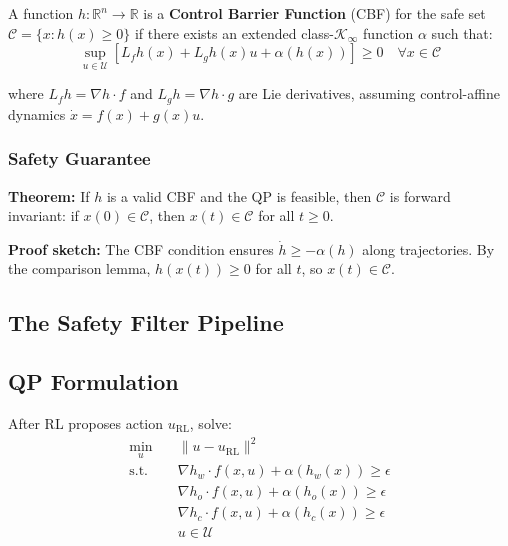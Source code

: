 \documentclass[11pt,a4paper]{report}
\begin{document}
A function $h: \mathbb{R}^n \to \mathbb{R}$ is a \textbf{Control Barrier Function} (CBF) for the safe set $\mathcal{C} = \{x : h(x) \geq 0\}$ if there exists an extended class-$\mathcal{K}_\infty$ function $\alpha$ such that:
\begin{equation}
    \sup_{u \in \mathcal{U}} \left[ L_f h(x) + L_g h(x) u + \alpha(h(x)) \right] \geq 0 \quad \forall x \in \mathcal{C}
\end{equation}

where $L_f h = \nabla h \cdot f$ and $L_g h = \nabla h \cdot g$ are Lie derivatives, assuming control-affine dynamics $\dot{x} = f(x) + g(x)u$.

\subsubsection{Safety Guarantee}

\textbf{Theorem:} If $h$ is a valid CBF and the QP is feasible, then $\mathcal{C}$ is forward invariant: if $x(0) \in \mathcal{C}$, then $x(t) \in \mathcal{C}$ for all $t \geq 0$.

\textbf{Proof sketch:} The CBF condition ensures $\dot{h} \geq -\alpha(h)$ along trajectories. By the comparison lemma, $h(x(t)) \geq 0$ for all $t$, so $x(t) \in \mathcal{C}$.

\subsection{The Safety Filter Pipeline}

\begin{center}
\end{center}

\subsection{QP Formulation}

After RL proposes action $u_{\text{RL}}$, solve:
\begin{equation}
    \begin{aligned}
        \min_{u} \quad & \|u - u_{\text{RL}}\|^2 \\
        \text{s.t.} \quad & \nabla h_w \cdot f(x,u) + \alpha(h_w(x)) \geq \epsilon \\
        & \nabla h_o \cdot f(x,u) + \alpha(h_o(x)) \geq \epsilon \\
        & \nabla h_c \cdot f(x,u) + \alpha(h_c(x)) \geq \epsilon \\
        & u \in \mathcal{U}
    \end{aligned}
\end{equation}
\end{document}
